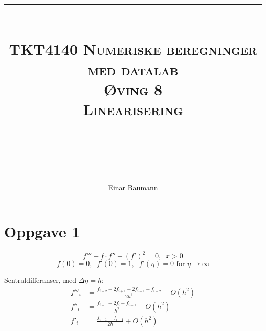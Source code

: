 




\author{Einar Baumann}
\title{
    \vspace{-1in}
    \vspace{0.1in}
    \rule{\textwidth}{0.5pt} \\[0.5cm]
    \normalfont \normalsize \textsc{TKT4140 Numeriske beregninger med datalab} \\ [20pt]
    {\textsc{ \huge Øving 8 }} \\ [0.5cm]
    {\textsc {\Large Linearisering} } \\
    \vspace{0.1in}
    \rule{\textwidth}{2pt} \\[0.7cm]
}


\maketitle
\thispagestyle{empty}
\clearpage



\section*{Oppgave 1} %
\label{sec:oppgave_1}

\begin{equation}
  f''' + f\cdot f'' - (f')^2 = 0, \;\; x > 0 \label{eq:1_main}
\end{equation}
\begin{equation}
  \tag{b}
  f(0) = 0, \;\; f'(0) = 1, \;\; f'(\eta) = 0 \text{ for } \eta \rightarrow \infty
\end{equation}

\noindent Sentraldifferanser, med $\Delta \eta = h$:
\begin{subequations}
\begin{align}
  f'''_i &= \frac{f_{i+2} - 2f_{i+1} + 2f_{i-1} - f_{i-2}}{2h^3} + O(h^2) \\
  f''_i  &= \frac{f_{i+1} - 2f_i + f_{i-1}}{h^2} + O(h^2) \\
  f'_i   &= \frac{f_{i+1} - f_{i-1}}{2h} + O(h^2)
\end{align}
\end{subequations}

